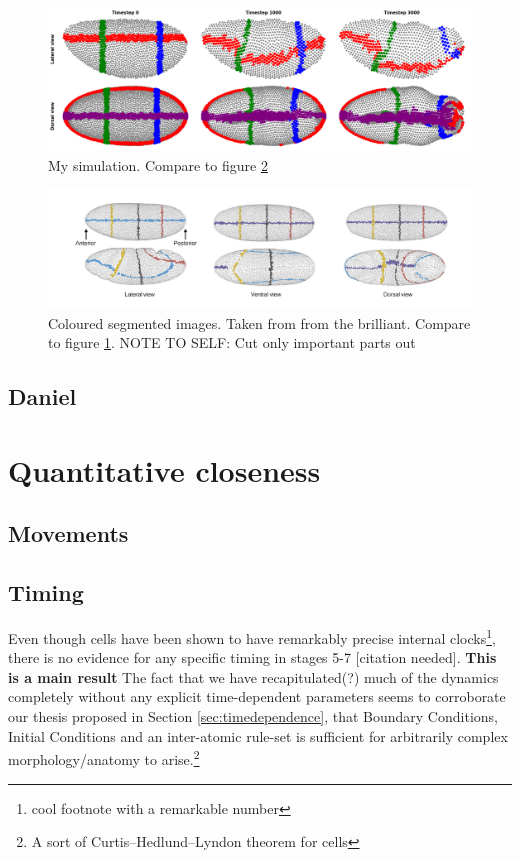 \begin{figure}[H]
    \centering
    \includegraphics[width=1\linewidth]{chapters/Results/figures/band_movements.png}
    \caption{My simulation. Compare to figure \ref{fig:band-movements-stas}}
    \label{fig:band-movements}
\end{figure}
\begin{figure}[H]
    \centering
    \includegraphics[width=1\linewidth]{chapters/Results/figures/compareStasGBShape.png}
    \caption{Coloured segmented images. Taken from from the brilliant\cite{stern2022deconstructing}. Compare to figure \ref{fig:band-movements}. NOTE TO SELF: Cut only important parts out}
    \label{fig:band-movements-stas}
\end{figure}

\subsection{Daniel}
\section{Quantitative closeness}
\subsection{Movements}
\subsection{Timing}
Even though cells have been shown to have remarkably precise internal clocks\footnote{cool footnote with a remarkable number}\cite{}, there is no evidence for any specific timing in stages 5-7 [citation needed].\textbf{ This is a main result} The fact that we have recapitulated(?) much of the dynamics completely without any explicit time-dependent parameters seems to corroborate our thesis proposed in Section \ref{sec:timedependence}, that Boundary Conditions, Initial Conditions and an inter-atomic rule-set is sufficient for arbitrarily complex morphology/anatomy to arise.\footnote{A sort of Curtis–Hedlund–Lyndon theorem for cells}    

